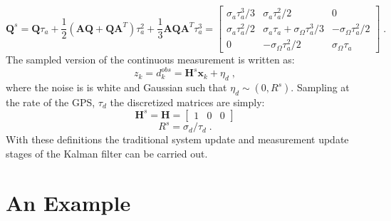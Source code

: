 \documentclass[paper=a4, fontsize=11pt]{scrartcl} %
\numberwithin{equation}{section} %
\numberwithin{figure}{section} %
\numberwithin{table}{section} %
\begin{document}
$$
\mathbf{Q}^s=\mathbf{Q}\tau_a+\frac{1}{2}(\mathbf{AQ}+\mathbf{QA}^T)\tau_a^2+\frac{1}{3}\mathbf{AQA}^T\tau^3_a=\left[\begin{matrix}
\sigma_a\tau_a^3/3 & \sigma_a\tau_a^2/2 & 0 \\
\sigma_a\tau_a^2/2 & \sigma_a\tau_a+\sigma_\Omega\tau_a^3/3 & -\sigma_\Omega\tau_a^2/2 \\
0 & -\sigma_\Omega\tau_a^2/2 & \sigma_\Omega\tau_a \end{matrix}\right]\;.
$$
The sampled version of the continuous measurement is written as:
$$
z_k=d^{obs}_k=\mathbf{H}^s\mathbf{x}_k+\eta_d\;,
$$
where the noise is is white and Gaussian such that $\eta_d\sim(0,R^s)$. Sampling at the rate of the GPS, $\tau_d$ the discretized matrices are simply:
$$
\mathbf{H}^s=\mathbf{H}=\left[\begin{matrix}
 1 & 0 & 0
\end{matrix}\right]
$$
$$
R^s=\sigma_d/\tau_d\;.
$$
With these definitions the traditional system update and measurement update stages of the Kalman filter can be carried out.

\section{An Example}
\end{document}
